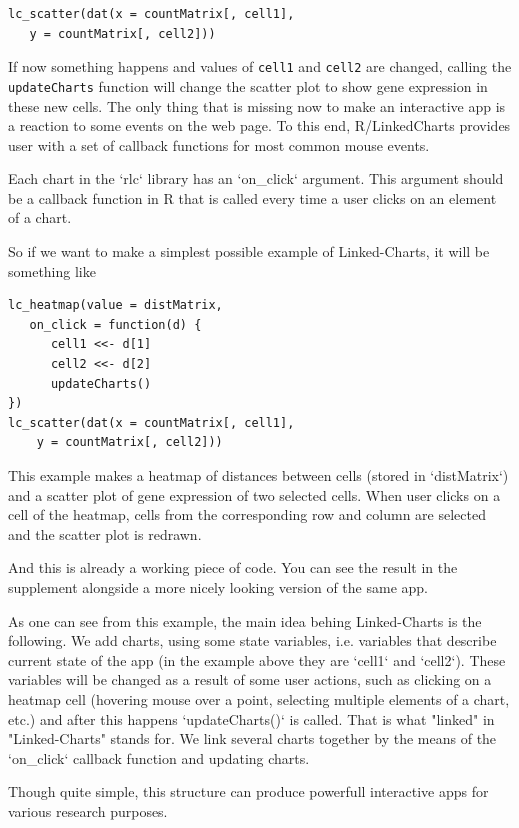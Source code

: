 \documentclass[twocolumn,10pt]{article}
\begin{document}
\begin{verbatim}
lc_scatter(dat(x = countMatrix[, cell1], 
   y = countMatrix[, cell2]))
\end{verbatim}

If now something happens and values of \texttt{cell1} and \texttt{cell2} are changed, calling the \texttt{updateCharts} function will change the scatter plot to show gene expression in these new cells. The only thing that is missing now to make an interactive app is a reaction to some events on the web page. To this end, R/LinkedCharts provides user with a set of callback functions for most common mouse events. 

 Each chart in the `rlc` library has an `on_click` argument. This argument should be a callback function in R that is called every time a user clicks on an element of a chart.

So if we want to make a simplest possible example of Linked-Charts, it will be something like

\begin{verbatim}
lc_heatmap(value = distMatrix, 
   on_click = function(d) {
      cell1 <<- d[1]
      cell2 <<- d[2]
      updateCharts()
})
lc_scatter(dat(x = countMatrix[, cell1],
	y = countMatrix[, cell2]))
\end{verbatim}

This example makes a heatmap of distances between cells (stored in `distMatrix`) and a scatter plot of gene expression of two selected cells. When user clicks on a cell of the heatmap, cells from the corresponding row and column are selected and the scatter plot is redrawn.

And this is already a working piece of code. You can see the result in the supplement alongside a more nicely looking version of the same app.

As one can see from this example, the main idea behing Linked-Charts is the following. We add charts, using some state variables, i.e. variables that describe current state of the app (in the example above they are `cell1` and `cell2`). These variables will be changed as a result of some user actions, such as clicking on a heatmap cell (hovering mouse over a point, selecting multiple elements of a chart, etc.) and after this happens `updateCharts()` is called. That is what "linked" in "Linked-Charts" stands for. We link several charts together by the means of the `on_click` callback function and updating charts.

Though quite simple, this structure can produce powerfull interactive apps for various research purposes.
\end{document}
